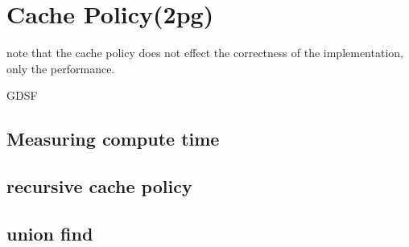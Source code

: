 \section{Cache Policy(2pg)}
note that the cache policy does not effect the correctness of the implementation, only the performance.

GDSF
\subsection{Measuring compute time}
\subsection{recursive cache policy}
\subsection{union find}